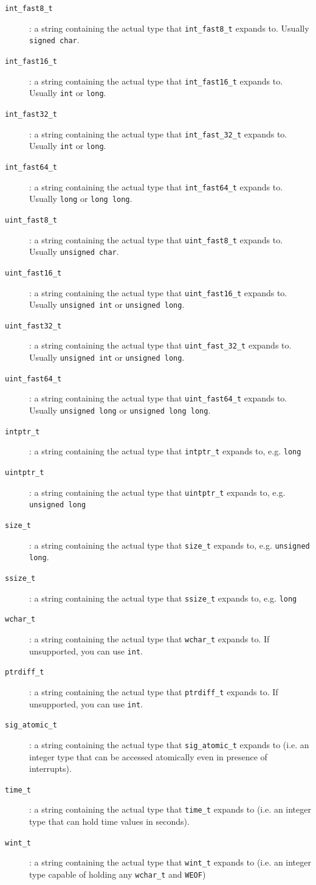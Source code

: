 \begin{description}
\item[\texttt{int\_fast8\_t}]: a string containing the actual type that
  \verb+int_fast8_t+ expands to. Usually \verb+signed char+.
\item[\texttt{int\_fast16\_t}]: a string containing the actual type that
  \verb+int_fast16_t+ expands to. Usually \verb+int+ or \verb+long+.
\item[\texttt{int\_fast32\_t}]: a string containing the actual type that
  \verb+int_fast_32_t+ expands to. Usually \verb+int+ or \verb+long+.
\item[\texttt{int\_fast64\_t}]: a string containing the actual type that
  \verb+int_fast64_t+ expands to. Usually \verb+long+ or \verb+long long+.
\item[\texttt{uint\_fast8\_t}]: a string containing the actual type that
  \verb+uint_fast8_t+ expands to. Usually \verb+unsigned char+.
\item[\texttt{uint\_fast16\_t}]: a string containing the actual type that
  \verb+uint_fast16_t+ expands to. Usually \verb+unsigned int+ or \verb+unsigned long+.
\item[\texttt{uint\_fast32\_t}]: a string containing the actual type that
  \verb+uint_fast_32_t+ expands to. Usually \verb+unsigned int+ or \verb+unsigned long+.
\item[\texttt{uint\_fast64\_t}]: a string containing the actual type that
  \verb+uint_fast64_t+ expands to. Usually \verb+unsigned long+ or
  \verb+unsigned long long+.
\item[\texttt{intptr\_t}]: a string containing the actual type that
  \verb+intptr_t+ expands to, e.g. \verb+long+
\item[\texttt{uintptr\_t}]: a string containing the actual type that
  \verb+uintptr_t+ expands to, e.g. \verb+unsigned long+
\item[\texttt{size\_t}]: a string containing the actual type that
  \verb+size_t+ expands to, e.g. \verb+unsigned long+.
\item[\texttt{ssize\_t}]: a string containing the actual type that
  \verb+ssize_t+ expands to, e.g. \verb+long+
\item[\texttt{wchar\_t}]: a string containing the actual type that
  \verb+wchar_t+ expands to. If unsupported, you can use \verb+int+.
\item[\texttt{ptrdiff\_t}]: a string containing the actual type that
  \verb+ptrdiff_t+ expands to. If unsupported, you can use \verb+int+.
\item[\texttt{sig\_atomic\_t}]: a string containing the actual type that
  \verb+sig_atomic_t+ expands to (i.e. an integer type that can be
  accessed atomically even in presence of interrupts).
\item[\texttt{time\_t}]: a string containing the actual type that
  \verb+time_t+ expands to (i.e. an integer type that can hold time
  values in seconds).
\item[\texttt{wint\_t}]: a string containing the actual type that
  \verb+wint_t+ expands to (i.e. an integer type capable of holding any
  \verb+wchar_t+ and \verb+WEOF+)
\end{description}

